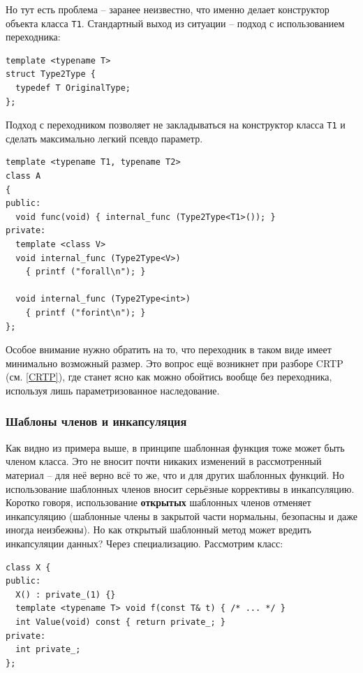 \documentclass[a4paper,12pt,oneside]{article}
\begin{document}
Но тут есть проблема -- заранее неизвестно, что именно делает конструктор объекта класса \lstinline!T1!. Стандартный выход из ситуации -- подход с использованием переходника: 

\begin{lstlisting}
template <typename T>
struct Type2Type {
  typedef T OriginalType;
};
\end{lstlisting}

Подход с переходником позволяет не закладываться на конструктор класса \lstinline!T1! и сделать максимально легкий псевдо параметр.

\begin{lstlisting}
template <typename T1, typename T2>
class A
{
public:
  void func(void) { internal_func (Type2Type<T1>()); }
private:
  template <class V>
  void internal_func (Type2Type<V>)
    { printf ("forall\n"); }

  void internal_func (Type2Type<int>)
    { printf ("forint\n"); }
};
\end{lstlisting}

Особое внимание нужно обратить на то, что переходник в таком виде имеет минимально возможный размер. Это вопрос ещё возникнет при разборе CRTP (см. \ref{CRTP}), где станет ясно как можно обойтись вообще без переходника, используя лишь параметризованное наследование.

\subsubsection{Шаблоны членов и инкапсуляция}\label{TemplMembersEncapsulation}

Как видно из примера выше, в принципе шаблонная функция тоже может быть членом класса. Это не вносит почти никаких изменений в рассмотренный материал -- для неё верно всё то же, что и для других шаблонных функций. Но использование шаблонных членов вносит серьёзные коррективы в инкапсуляцию. Коротко говоря, использование \textbf{открытых} шаблонных членов отменяет инкапсуляцию (шаблонные члены в закрытой части нормальны, безопасны и даже иногда неизбежны). Но как открытый шаблонный метод может вредить инкапсуляции данных? Через специализацию. Рассмотрим класс:

\begin{lstlisting}
class X {
public:
  X() : private_(1) {}
  template <typename T> void f(const T& t) { /* ... */ }
  int Value(void) const { return private_; }
private:
  int private_;  
};
\end{lstlisting}
\end{document}
